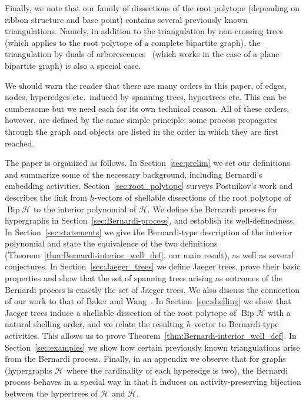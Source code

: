 \documentclass[10pt]{amsart}
\theoremstyle{definition}\newtheorem{defi}[theo]{Definition}
\theoremstyle{remark}\newtheorem{rema}[theo]{Remark}
\newcommand{\HH}{\mathcal H}
\DeclareMathOperator{\bip}{Bip}
\begin{document}
Finally, we note that our family of dissections of the root polytope (depending on ribbon structure and base point) contains several previously known triangulations. Namely, in addition to the triangulation by non-crossing trees~\cite{GGP} (which applies to the root polytope of a complete bipartite graph), the triangulation by duals of arborescences~\cite{KM} (which works in the case of a plane bipartite graph) is also a special case.

We should warn the reader that there are many orders in this paper, of edges, nodes, hyperedges etc.\ induced by spanning trees, hypertrees etc. This can be cumbersome but we need each for its own technical reason. All of these orders, however, are defined by the same simple principle: some process propagates through the graph and objects are listed in the order in which they are first reached. 

The paper is organized as follows. 
In Section~\ref{sec:prelim} we set our definitions and summarize some of the necessary background, including Bernardi's embedding activities. 
Section~\ref{sec:root_polytope} surveys Postnikov's work and describes the link from $h$-vectors of shellable dissections of the root polytope of $\bip \HH$ to the interior polynomial of $\HH$. 
We define the Bernardi process for hypergraphs in Section~\ref{sec:Bernardi-process}, and establish its well-definedness. 
In Section~\ref{sec:statements} we give the Bernardi-type description of the interior polynomial and state the equivalence of the two definitions (Theorem~\ref{thm:Bernardi-interior_well_def}, our main result), as well as several conjectures. 
In Section~\ref{sec:Jaeger_trees} we define Jaeger trees, prove their basic properties and show that the set of spanning trees arising as outcomes of the Bernardi process is exactly the set of Jaeger trees. We also discuss the connection of our work to that of Baker and Wang~\cite{Baker-Wang}. 
In Section~\ref{sec:shelling} we show that Jaeger trees induce a shellable dissection of the root polytope of $\bip \HH$ with a natural shelling order, and we relate the resulting $h$-vector to Bernardi-type activities. This allows us to prove Theorem~\ref{thm:Bernardi-interior_well_def}.
In Section~\ref{sec:examples} we show how certain previously known triangulations arise from the Bernardi process.
Finally, in an appendix we observe that for graphs (\ie hypergraphs $\HH$ where the cardinality of each hyperedge is two), the Bernardi process behaves in a special way in that it induces an activity-preserving bijection between the hypertrees of $\HH$ and $\overline{\HH}$. 
\end{document}
